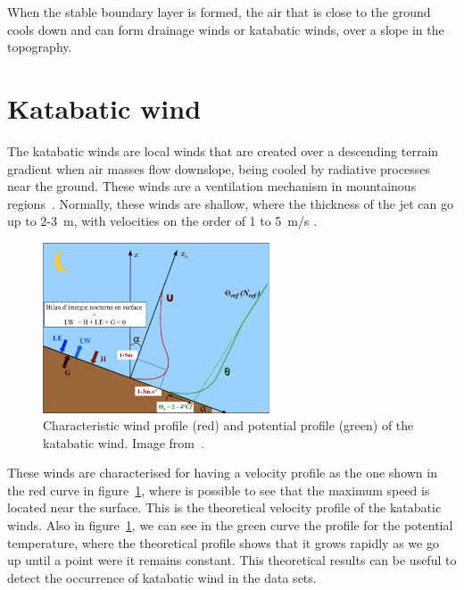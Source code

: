 When the stable boundary layer is formed, the air that is close to the ground cools down and can form drainage winds or katabatic winds, over a slope in the topography.

\section{Katabatic wind} \label{sec:katabatic_winds}

The katabatic winds are local winds that are created over a descending terrain gradient when air masses flow downslope, being cooled by radiative processes near the ground. These winds are a ventilation mechanism in mountainous regions~\citep{manins1979model}. Normally, these winds are shallow, where the thickness of the jet can go up to 2-3~m, with velocities on the order of 1 to 5~m/s \citep{stull2012introduction}. 

\begin{figure}[ht!]
	\vspace{-5pt}
    \centering
\includegraphics[width=0.6\textwidth]{fig/chapter_2/profiles_katabatic_wind.png}
    \caption{Characteristic wind profile (red) and potential profile (green) of the katabatic wind. Image from~\cite{claudine}.}
    \label{fig:u_profile}
  \vspace{-5pt}
\end{figure}

These winds are characterised for having a velocity profile as the one shown in the red curve in figure~\ref{fig:u_profile}, where is possible to see that the maximum speed is located near the surface. This is the theoretical velocity profile of the katabatic winds. Also in figure~\ref{fig:u_profile}, we can see in the green curve the profile for the potential temperature, where the theoretical profile shows that it grows rapidly as we go up until a point were it remains constant. This theoretical results can be useful to detect the occurrence of katabatic wind in the data sets.

